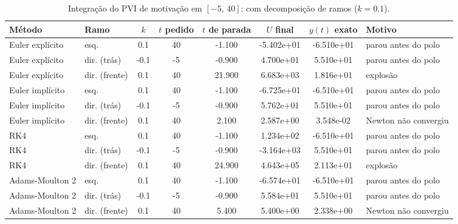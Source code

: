\begin{table}[H]
    \centering
    \small
    \begin{tabular}{llcccccl}
        \hline
        Método & Ramo & $k$ & $t$ pedido & $t$ de parada & $U$ final & $y(t)$ exato & Motivo \\
        \hline
        Euler explícito & esq. & 0.1 & 40 & -1.100 & -5.402e+01 & -6.510e+01 & parou antes do polo \\
        Euler explícito & dir. (trás) & -0.1 & -5 & -0.900 & 4.700e+01 & 5.510e+01 & parou antes do polo \\
        Euler explícito & dir. (frente) & 0.1 & 40 & 21.900 & 6.683e+03 & 1.816e+01 & explosão \\
        Euler implícito & esq. & 0.1 & 40 & -1.100 & -6.725e+01 & -6.510e+01 & parou antes do polo \\
        Euler implícito & dir. (trás) & -0.1 & -5 & -0.900 & 5.762e+01 & 5.510e+01 & parou antes do polo \\
        Euler implícito & dir. (frente) & 0.1 & 40 & 2.100 & 2.587e+00 & 3.548e-02 & Newton não convergiu \\
        RK4 & esq. & 0.1 & 40 & -1.100 & 1.234e+02 & -6.510e+01 & parou antes do polo \\
        RK4 & dir. (trás) & -0.1 & -5 & -0.900 & -3.164e+03 & 5.510e+01 & parou antes do polo \\
        RK4 & dir. (frente) & 0.1 & 40 & 24.900 & 4.643e+05 & 2.113e+01 & explosão \\
        Adams-Moulton 2 & esq. & 0.1 & 40 & -1.100 & -6.574e+01 & -6.510e+01 & parou antes do polo \\
        Adams-Moulton 2 & dir. (trás) & -0.1 & -5 & -0.900 & 5.584e+01 & 5.510e+01 & parou antes do polo \\
        Adams-Moulton 2 & dir. (frente) & 0.1 & 40 & 5.400 & 5.400e+00 & 2.338e+00 & Newton não convergiu \\
        \hline
    \end{tabular}
    \caption{Integração do PVI de motivação em $[-5,\, 40]$: com decomposição de ramos ($k = 0.1$).}
    \label{tab:m5_40_com_decomposicao_ramos}
\end{table}
